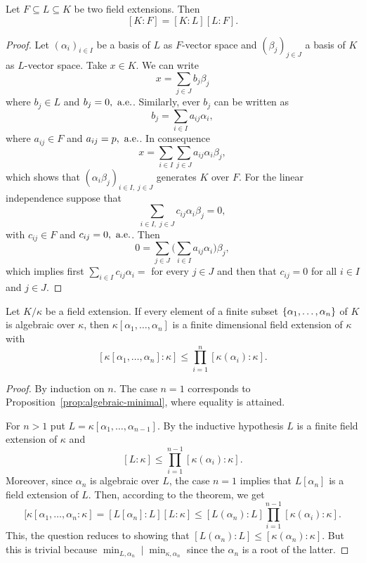 \begin{thm}
    Let\/ $F \subseteq L \subseteq K$ be two field extensions. Then
    $$
        [K : F] = [K : L][L : F].
    $$
\end{thm}

\begin{proof}
    Let $(\alpha_i)_{i\in I}$ be a basis of $L$ as $F$-vector space and $(\beta_j)_{j\in J}$ a basis of $K$ as $L$-vector space. Take $x\in K$. We can write
    $$
        x = \sum_{j\in J} b_j\beta_j
    $$
    where $b_j\in L$ and $b_j=0,{\rm\ a.e.}$. Similarly, ever $b_j$ can be written as
    $$
        b_j = \sum_{i\in I}a_{ij}\alpha_i,
    $$
    where $a_{ij}\in F$ and $a_{ij}=p,{\rm\ a.e.}$. In consequence
    $$
        x = \sum_{i\in I}\sum_{j\in J}a_{ij}\alpha_i\beta_j,
    $$
    which shows that $(\alpha_i\beta_j)_{i\in I,\;j\in J}$ generates $K$ over $F$. For the linear independence suppose that
    $$
        \sum_{i\in I,\;j\in J}c_{ij}\alpha_i\beta_j=0,
    $$
    with $c_{ij}\in F$ and $c_{ij}=0,{\rm\ a.e.}$. Then
    $$
        0 = \sum_{j\in J}\Big(\sum_{i\in I} a_{ij}\alpha_i\Big)\beta_j,
    $$
    which implies first $\sum_{i\in I}c_{ij}\alpha_i=$ for every $j\in J$ and then that $c_{ij}=0$ for all $i\in I$ and $j\in J$.
\end{proof}

\begin{prop}\label{prop:finitely-generated-extensions-are-finite}
    Let\/ $K/\kappa$ be a field extension. If every element of a finite subset\/ $\{\alpha_1,\dots,\alpha_n\}$ of $K$ is algebraic over\/ $\kappa$, then\/ $\kappa[\alpha_1, \dots ,\alpha_n]$ is a finite dimensional field extension of\/ $\kappa$ with
    $$
        [\kappa[\alpha_1,\dots,\alpha_n]:\kappa]
            \le\prod_{i=1}^n[\kappa(\alpha_i):\kappa].
    $$
\end{prop}

\begin{proof}
    By induction on $n$. The case $n=1$ corresponds to Proposition~\ref{prop:algebraic-minimal}, where equality is attained.

    For $n>1$ put $L=\kappa[\alpha_1,\dots,\alpha_{n-1}]$. By the inductive hypothesis $L$ is a finite field extension of $\kappa$ and
    $$
        [L:\kappa]
            \le\prod_{i=1}^{n-1}[\kappa(\alpha_i):\kappa].
    $$
    Moreover, since $\alpha_n$ is algebraic over $L$, the case $n=1$ implies that $L[\alpha_n]$ is a field extension of $L$. Then, according to the theorem, we get
    $$
        [\kappa[\alpha_1,\dots,\alpha_n:\kappa]
            = [L[\alpha_n]:L][L:\kappa]
                \le[L(\alpha_n):L]\prod_{i=1}^{n-1}
                    [\kappa(\alpha_i):\kappa].
    $$
    This, the question reduces to showing that $[L(\alpha_n):L]\le[\kappa(\alpha_n):\kappa]$. But this is trivial because $\min_{L,\alpha_n}\mid\min_{\kappa,\alpha_n}$ since the $\alpha_n$ is a root of the latter.
\end{proof}

